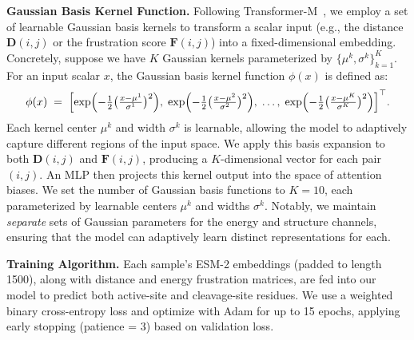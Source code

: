 \textbf{Gaussian Basis Kernel Function.}
Following Transformer-M~\cite{TransformerM}, we employ a set of learnable Gaussian basis kernels to transform a scalar input (e.g., the distance \(\mathbf{D}(i,j)\) or the frustration score \(\mathbf{F}(i,j)\)) into a fixed-dimensional embedding. Concretely, suppose we have \(K\) Gaussian kernels parameterized by \(\{\mu^k, \sigma^k\}_{k=1}^{K}\). For an input scalar \(x\), the Gaussian basis kernel function \(\phi(x)\) is defined as:
\begin{equation}
\label{eq:gaussian_basis}
    \phi(x)
    \;=\;
    \Bigl[
        \exp\Bigl(-\tfrac{1}{2}\bigl(\tfrac{x - \mu^1}{\sigma^1}\bigr)^2\Bigr),\;
        \exp\Bigl(-\tfrac{1}{2}\bigl(\tfrac{x - \mu^2}{\sigma^2}\bigr)^2\Bigr),
        \;\dots,\;
        \exp\Bigl(-\tfrac{1}{2}\bigl(\tfrac{x - \mu^K}{\sigma^K}\bigr)^2\Bigr)
    \Bigr]^\top.
\end{equation}
Each kernel center \(\mu^k\) and width \(\sigma^k\) is learnable, allowing the model to adaptively capture different regions of the input space. We apply this basis expansion to both \(\mathbf{D}(i,j)\) and \(\mathbf{F}(i,j)\), producing a \(K\)-dimensional vector for each pair \((i,j)\). An MLP then projects this kernel output into the space of attention biases.
We set the number of Gaussian basis functions to \(K=10\), each parameterized by learnable centers \(\mu^k\) and widths \(\sigma^k\). Notably, we maintain \emph{separate} sets of Gaussian parameters for the energy and structure channels, ensuring that the model can adaptively learn distinct representations for each. 




\textbf{Training Algorithm.}
Each sample's ESM-2 embeddings (padded to length 1500), along with distance and energy frustration matrices, are fed into our model to predict both active-site and cleavage-site residues. We use a weighted binary cross-entropy loss and optimize with Adam for up to 15 epochs, applying early stopping (patience = 3) based on validation loss.


